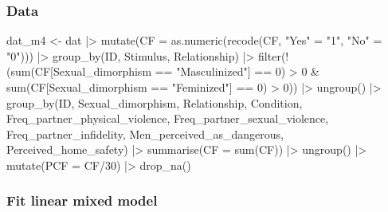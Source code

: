 \documentclass[
  bookmarksnumbered]{article}
\newenvironment{Shaded}{\begin{snugshade}}{\end{snugshade}}
\newcommand{\AttributeTok}[1]{\textcolor[rgb]{0.80,0.80,0.80}{#1}}
\newcommand{\DecValTok}[1]{\textcolor[rgb]{0.86,0.86,0.80}{#1}}
\newcommand{\FunctionTok}[1]{\textcolor[rgb]{0.94,0.94,0.56}{#1}}
\newcommand{\NormalTok}[1]{\textcolor[rgb]{0.80,0.80,0.80}{#1}}
\newcommand{\OtherTok}[1]{\textcolor[rgb]{0.94,0.94,0.56}{#1}}
\newcommand{\SpecialCharTok}[1]{\textcolor[rgb]{0.86,0.64,0.64}{#1}}
\newcommand{\StringTok}[1]{\textcolor[rgb]{0.80,0.58,0.58}{#1}}
\begin{document}
\subsubsection{Data}\label{data-3}

\begin{Shaded}
\begin{Highlighting}[]
\NormalTok{dat\_m4  }\OtherTok{\textless{}{-}}\NormalTok{ dat }\SpecialCharTok{|\textgreater{}} 
  \FunctionTok{mutate}\NormalTok{(}\AttributeTok{CF =} \FunctionTok{as.numeric}\NormalTok{(}\FunctionTok{recode}\NormalTok{(CF,}
                                \StringTok{"Yes"} \OtherTok{=}  \StringTok{"1"}\NormalTok{,}
                                \StringTok{"No"} \OtherTok{=} \StringTok{"0"}\NormalTok{))) }\SpecialCharTok{|\textgreater{}} 
  \FunctionTok{group\_by}\NormalTok{(ID, Stimulus, Relationship) }\SpecialCharTok{|\textgreater{}} 
  \FunctionTok{filter}\NormalTok{(}\SpecialCharTok{!}\NormalTok{(}\FunctionTok{sum}\NormalTok{(CF[Sexual\_dimorphism }\SpecialCharTok{==} \StringTok{"Masculinized"}\NormalTok{] }\SpecialCharTok{==} \DecValTok{0}\NormalTok{) }\SpecialCharTok{\textgreater{}} \DecValTok{0} \SpecialCharTok{\&} 
             \FunctionTok{sum}\NormalTok{(CF[Sexual\_dimorphism }\SpecialCharTok{==} \StringTok{"Feminized"}\NormalTok{] }\SpecialCharTok{==} \DecValTok{0}\NormalTok{) }\SpecialCharTok{\textgreater{}} \DecValTok{0}\NormalTok{)) }\SpecialCharTok{|\textgreater{}}
  \FunctionTok{ungroup}\NormalTok{() }\SpecialCharTok{|\textgreater{}} 
  \FunctionTok{group\_by}\NormalTok{(ID, Sexual\_dimorphism, Relationship, Condition,}
\NormalTok{           Freq\_partner\_physical\_violence,}
\NormalTok{           Freq\_partner\_sexual\_violence,}
\NormalTok{           Freq\_partner\_infidelity,}
\NormalTok{           Men\_perceived\_as\_dangerous,}
\NormalTok{           Perceived\_home\_safety) }\SpecialCharTok{|\textgreater{}} 
  \FunctionTok{summarise}\NormalTok{(}\AttributeTok{CF =} \FunctionTok{sum}\NormalTok{(CF)) }\SpecialCharTok{|\textgreater{}} 
  \FunctionTok{ungroup}\NormalTok{() }\SpecialCharTok{|\textgreater{}} 
  \FunctionTok{mutate}\NormalTok{(}\AttributeTok{PCF =}\NormalTok{ CF}\SpecialCharTok{/}\DecValTok{30}\NormalTok{) }\SpecialCharTok{|\textgreater{}} 
  \FunctionTok{drop\_na}\NormalTok{()}
\end{Highlighting}
\end{Shaded}

\subsubsection{Fit linear mixed model}\label{fit-linear-mixed-model-3}
\end{document}

